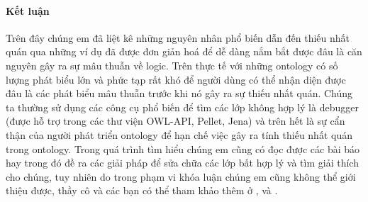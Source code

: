 
\paragraph{Kết luận}
Trên đây chúng em đã liệt kê những nguyên nhân phổ biến dẫn đến thiếu nhất quán qua những ví dụ đã được đơn giản hoá để dễ dàng nắm bắt được đâu là căn nguyên gây ra sự mâu thuẫn về logic. Trên thực tế với những ontology có số lượng phát biểu lớn và phức tạp rất khó để người dùng có thể nhận diện được đâu là các phát biểu mâu thuẫn trước khi nó gây ra sự thiếu nhất quán. Chúng ta thường sử dụng các công cụ phổ biến để tìm các lớp không hợp lý là debugger (được hỗ trợ trong các thư viện OWL-API, Pellet, Jena) và trên hết là sự cẩn thận của người phát triển ontology để hạn chế việc gây ra tính thiếu nhất quán trong ontology. Trong quá trình tìm hiểu chúng em cũng có đọc được các bài báo hay trong đó đề ra các giải pháp để sửa chữa các lớp bất hợp lý và tìm giải thích cho chúng, tuy nhiên do trong phạm vi khóa luận chúng em cũng không thể giới thiệu được, thầy cô và các bạn có thể tham khảo thêm ở \cite{repair}, \cite{axiomPinpoint} và \cite{matt_horridge}.

